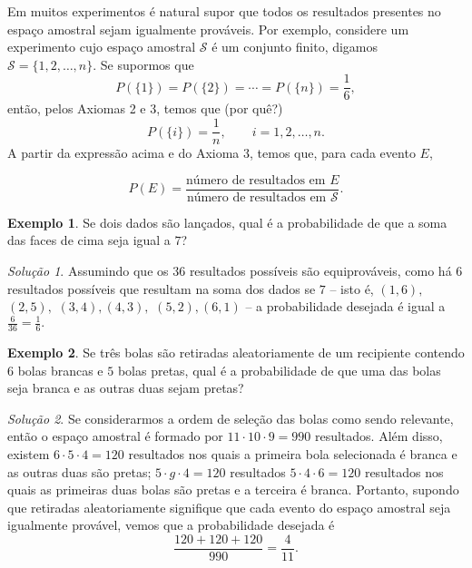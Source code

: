\documentclass[]{book}
\theoremstyle{definition}
\theoremstyle{definition}
\newtheorem{example}{Exemplo}[chapter]
\theoremstyle{definition}
\theoremstyle{remark}
\newtheorem*{solution}{Solução}
\begin{document}
Em muitos experimentos é natural supor que todos os resultados presentes no espaço amostral sejam igualmente prováveis.
Por exemplo, considere um experimento cujo espaço amostral \(\mathcal{S}\) é um conjunto finito, digamos \(\mathcal{S}=\{1,2,\ldots, n\}\).
Se supormos que
\[P(\{1\})= P(\{2\})= \cdots = P(\{n\})= \frac{1}{6},\]
então, pelos Axiomas 2 e 3, temos que (por quê?)
\[P(\{i\})=\frac{1}{n}, \qquad i=1,2,\ldots, n.\]
A partir da expressão acima e do Axioma 3, temos que, para cada evento \(E\),

\[P(E)=\frac{\text{número de resultados em }E}{\text{número de resultados em } \mathcal{S}}.\]

\begin{example}
\protect\hypertarget{exm:unnamed-chunk-130}{}{\label{exm:unnamed-chunk-130} }Se dois dados são lançados, qual é a probabilidade de que a soma das faces de cima seja igual a \(7\)?
\end{example}

\begin{solution}
\iffalse{} {Solução. } \fi{}Assumindo que os \(36\) resultados possíveis são equiprováveis, como há \(6\) resultados possíveis que resultam na soma dos dados se \(7\) -- isto é, \((1,6),\) \((2,5),\) \((3,4), (4,3),\) \((5,2), (6,1)\) -- a probabilidade desejada é igual a \(\frac{6}{36}=\frac{1}{6}.\)
\end{solution}

\begin{example}
\protect\hypertarget{exm:unnamed-chunk-132}{}{\label{exm:unnamed-chunk-132} }Se três bolas são retiradas aleatoriamente de um recipiente contendo \(6\) bolas brancas e \(5\) bolas pretas, qual é a probabilidade de que uma das bolas seja branca e as outras duas sejam pretas?
\end{example}

\begin{solution}
\iffalse{} {Solução. } \fi{}Se considerarmos a ordem de seleção das bolas como sendo relevante, então o espaço amostral é formado por \(11\cdot 10\cdot 9 = 990\) resultados.
Além disso, existem \(6\cdot 5\cdot 4 = 120\) resultados nos quais a primeira bola selecionada é branca e as outras duas são pretas; \(5\cdot g\cdot 4 = 120\) resultados \(5\cdot 4\cdot 6 = 120\) resultados nos quais as primeiras duas bolas são pretas e a terceira é branca.
Portanto, supondo que retiradas aleatoriamente signifique que cada evento do espaço amostral seja igualmente provável, vemos que a probabilidade desejada é
\[\frac{120 + 120 + 120}{990}=\frac{4}{11}.\]
\end{solution}
\end{document}
